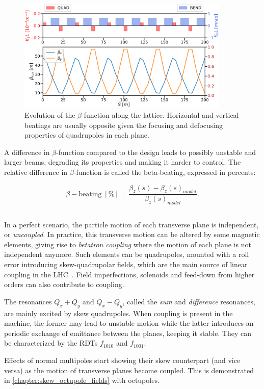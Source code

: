\begin{figure}[H]
    \centering
    \includegraphics[width=0.9\textwidth]{images/beta_function.pdf}
    \caption{Evolution of the $\beta$-function along the lattice. Horizontal and vertical beatings
    are usually opposite given the focusing and defocusing properties of quadrupoles in each plane.}
    \label{fig:beam_optics:beta}
\end{figure}

A difference in $\beta$-function compared to the design leads to possibly unstable and larger beams,
degrading its properties and making it harder to control. The relative difference in
$\beta$-function is called the beta-beating, expressed in percents: 

\begin{equation}
    \beta-\mathrm{beating \; [\%]}  = \frac{\beta_z(s) - \beta_z(s)_{model}}{\beta_z(s)_{model}}.
    \label{eq:beam_optics:beating}
\end{equation}


\subsection{}

In a perfect scenario, the particle motion of each transverse plane is independent, or
\textit{uncoupled}. In practice, this transverse motion can be altered by some magnetic elements,
giving rise to \textit{betatron coupling} where the motion of each plane is not independent anymore.
Such elements can be quadrupoles, mounted with a roll error introducing skew-quadrupolar fields,
which are the main source of linear coupling in the LHC~\cite{felix_soubelet_local_2023}. Field
imperfections, solenoids and feed-down from higher orders can also contribute to coupling.

The resonances $Q_x + Q_y$ and $Q_x - Q_y$, called the \textit{sum} and \textit{difference}
resonances, are mainly excited by skew quadrupoles. When coupling is present in the
machine, the former may lead to unstable motion while the latter introduces an periodic exchange of
emittance between the planes, keeping it stable. They can be characterized by the RDTs $f_{1010}$
and $f_{1001}$.

Effects of normal multipoles start showing their skew counterpart (and vice versa) as the motion
of transverse planes become coupled. This is demonstrated in \cref{chapter:skew_octupole_fields}
with octupoles.

